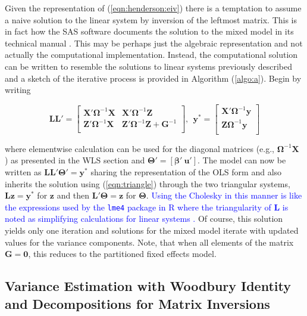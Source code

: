 \documentclass[12pt]{article}
\begin{document}
Given the representation of (\ref{eqn:henderson:eiv}) there is a temptation to assume a naive solution to the linear system by inversion of the leftmost matrix. This is in fact how the SAS software documents the solution to the mixed model in its technical manual \cite{sas}. This may be perhaps just the algebraic representation and not actually the computational implementation. Instead, the computational solution can be written to resemble the solutions to linear systems previously described and a sketch of the iterative process is provided in Algorithm (\ref{algo:a}). Begin by writing 

\begin{equation}
\label{eqn:chol}
\bm{L}\bm{L}' = 
\left [ 
\begin{array}{cc}
\bm{X'}\bm{\Omega}^{-1}\bm{X}& \bm{X'}\bm{\Omega}^{-1}\bm{Z}\\
\bm{Z}'\bm{\Omega}^{-1}\bm{X} & \bm{Z}'\bm{\Omega}^{-1}\bm{Z} + \bm{G}^{-1}\\
\end{array}
\right], \ \ 
\bm{y}^* = 
\left [ 
\begin{array}{c}
\bm{X'}\bm{\Omega}^{-1}\bm{y} \\
\bm{Z}\bm{\Omega}^{-1}\bm{y}\\
\end{array}
\right]
\end{equation}

\noindent where elementwise calculation can be used for the diagonal matrices (e.g., $\bm{\Omega}^{-1}\bm{X}$ ) as presented in the WLS section and $\bm{\Theta}' = \left[\bm{\beta}' \ \bm{u}'\right]$. The model can now be written as $\bm{L}\bm{L}'\bm{\Theta}'=\bm{y}^*$ sharing the representation of the OLS form and also inherits the solution using (\ref{eqn:triangle}) through the two triangular systems, $\bm{L}\bm{z}  = \bm{y}^*$ for $\bm{z}$ and then $\bm{L}' \bm{\Theta}  = \bm{z}$ for $\bm{\Theta}$. \textcolor{blue}{Using the Cholesky in this manner is like the expressions used by the \texttt{lme4} package in R where the triangularity of $\bm{L}$ is noted as simplifying calculations for linear systems \cite{doranjss}.} Of course, this solution yields only one iteration and solutions for the mixed model iterate with updated values for the variance components. Note, that when all elements of the matrix $\bm{G} = \bm{0}$, this reduces to the partitioned fixed effects model.

\subsection*{Variance Estimation with Woodbury Identity and Decompositions for Matrix Inversions}
\end{document}
